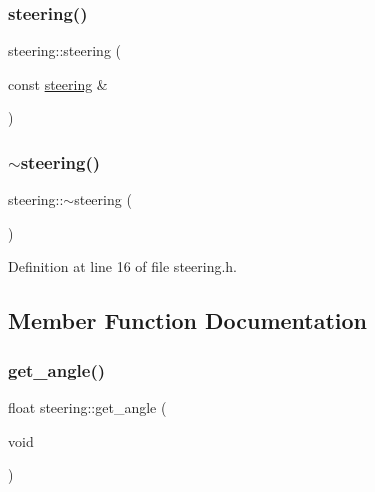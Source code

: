 \mbox{\label{classsteering_a5646ad884f0949253988d9a8ebec8278}} 
\subsubsection{\texorpdfstring{steering()}{steering()}\hspace{0.1cm}{\footnotesize\ttfamily [3/3]}}
{\footnotesize\ttfamily steering\+::steering (\begin{DoxyParamCaption}\item[{const \mbox{\hyperlink{classsteering}{steering}} \&}]{ }\end{DoxyParamCaption})\hspace{0.3cm}{\ttfamily [default]}}

\mbox{\label{classsteering_a9b686e0fb626c3e8dd16ee5106a842b7}} 
\subsubsection{\texorpdfstring{$\sim$steering()}{~steering()}}
{\footnotesize\ttfamily steering\+::$\sim$steering (\begin{DoxyParamCaption}{ }\end{DoxyParamCaption})\hspace{0.3cm}{\ttfamily [inline]}}



Definition at line 16 of file steering.\+h.



\subsection{Member Function Documentation}
\mbox{\label{classsteering_aa2e30069b2a7d5ec7c4d8eeb0e30da32}} 
\subsubsection{\texorpdfstring{get\_angle()}{get\_angle()}}
{\footnotesize\ttfamily float steering\+::get\+\_\+angle (\begin{DoxyParamCaption}\item[{void}]{ }\end{DoxyParamCaption})}



